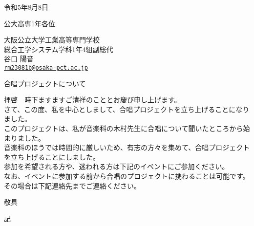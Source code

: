 \documentclass{jlreq}
\begin{document}
\begin{flushright}
    令和5年8月8日
\end{flushright}
\begin{flushleft}
    公大高専1年各位
\end{flushleft}
\begin{flushright}
    大阪公立大学工業高等専門学校\\
    総合工学システム学科1年4組副総代\\
    谷口 陽音\\
    \href{mailto:rm23081b@osaka-pct.ac.jp}{\nolinkurl{rm23081b@osaka-pct.ac.jp}}\\
\end{flushright}
\begin{center}
    \begin{Large}
        合唱プロジェクトについて
    \end{Large}
\end{center}
拝啓　時下ますますご清祥のこととお慶び申し上げます。\\
さて、この度、私を中心としまして、合唱プロジェクトを立ち上げることになりました。\\
このプロジェクトは、私が音楽科の木村先生に合唱について聞いたところから始まりました。\\
音楽科のほうでは時間的に厳しいため、有志の方々を集めて、合唱プロジェクトを立ち上げることにしました。\\
参加を希望される方や、迷われる方は下記のイベントにご参加ください。\\
なお、イベントに参加する前から合唱のプロジェクトに携わることは可能です。\\
その場合は下記連絡先までご連絡ください。\\
\begin{flushright}
    敬具
\end{flushright}
\begin{center}
    記\\
\end{center}
\end{document}
